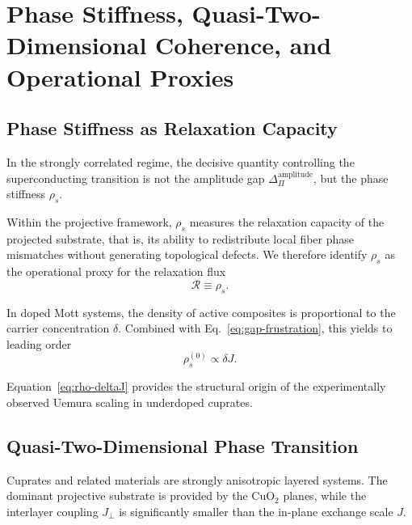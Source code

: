 \section{Phase Stiffness, Quasi-Two-Dimensional Coherence, and Operational Proxies}
  \label{sec:phase-stiffness}

  \subsection{Phase Stiffness as Relaxation Capacity}
    \label{subsec:stiffness-relaxation}

    In the strongly correlated regime,
    the decisive quantity controlling the superconducting transition
    is not the amplitude gap
    $\Delta_\Pi^{\mathrm{amplitude}}$,
    but the phase stiffness $\rho_s$.

    Within the projective framework,
    $\rho_s$ measures the relaxation capacity of the projected substrate,
    that is,
    its ability to redistribute local fiber phase mismatches
    without generating topological defects.
    We therefore identify $\rho_s$
    as the operational proxy for the relaxation flux
    \begin{equation}
      \mathcal{R}
      \equiv
      \rho_s .
      \label{eq:relaxation-proxy}
    \end{equation}

    In doped Mott systems,
    the density of active composites
    is proportional to the carrier concentration $\delta$.
    Combined with Eq.~\ref{eq:gap-frustration},
    this yields to leading order
    \begin{equation}
      \rho_s^{(0)}
      \propto
      \delta J .
      \label{eq:rho-deltaJ}
    \end{equation}

    Equation~\ref{eq:rho-deltaJ}
    provides the structural origin
    of the experimentally observed Uemura scaling
    in underdoped cuprates.

  \subsection{Quasi-Two-Dimensional Phase Transition}
    \label{subsec:quasi-2d}

    Cuprates and related materials
    are strongly anisotropic layered systems.
    The dominant projective substrate
    is provided by the CuO$_2$ planes,
    while the interlayer coupling $J_\perp$
    is significantly smaller than the in-plane exchange scale $J$.

